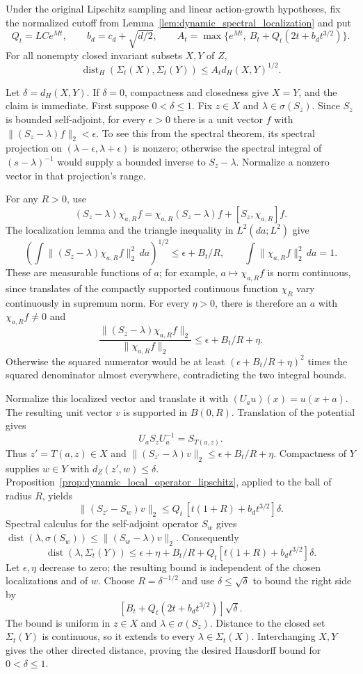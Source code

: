 \begin{corollary}
\label{cor:dynamic_subsystem_spectra}
Under the original Lipschitz sampling and linear action-growth
hypotheses, fix the normalized cutoff from
Lemma~\ref{lem:dynamic_spectral_localization} and put
\[
Q_t=LCe^{Mt},\qquad b_d=c_d+\sqrt{d/2},\qquad
A_t=\max\{e^{Mt},\ B_t+Q_t(2t+b_dt^{3/2})\}.
\]
For all nonempty closed invariant subsets $X,Y$ of $Z$,
\[
\operatorname{dist}_H(\Sigma_t(X),\Sigma_t(Y))
\leq A_t d_H(X,Y)^{1/2}.
\]
\end{corollary}
\Proof
Let $\delta=d_H(X,Y)$. If $\delta=0$, compactness and closedness give
$X=Y$, and the claim is immediate. First suppose $0<\delta\leq1$.
Fix $z\in X$ and $\lambda\in\sigma(S_z)$. Since $S_z$ is bounded
self-adjoint, for every $\epsilon>0$ there is a unit vector $f$ with
$\|(S_z-\lambda)f\|_2<\epsilon$. To see this from the spectral theorem,
its spectral projection on $(\lambda-\epsilon,\lambda+\epsilon)$ is
nonzero; otherwise the spectral integral of $(s-\lambda)^{-1}$ would
supply a bounded inverse to $S_z-\lambda$. Normalize a nonzero vector
in that projection's range.

For any $R>0$, use
\[
(S_z-\lambda)\chi_{a,R}f
=\chi_{a,R}(S_z-\lambda)f+[S_z,\chi_{a,R}]f.
\]
The localization lemma and the triangle inequality in $L^2(da;L^2)$
give
\[
\left(\int\|(S_z-\lambda)\chi_{a,R}f\|_2^2\,da\right)^{1/2}
\leq\epsilon+B_t/R,
\qquad \int\|\chi_{a,R}f\|_2^2\,da=1.
\]
These are measurable functions of $a$; for example,
$a\mapsto\chi_{a,R}f$ is norm continuous, since translates of the
compactly supported continuous function $\chi_R$ vary continuously in
supremum norm. For every $\eta>0$, there is therefore an $a$ with
$\chi_{a,R}f\ne0$ and
\[
\frac{\|(S_z-\lambda)\chi_{a,R}f\|_2}{\|\chi_{a,R}f\|_2}
\leq\epsilon+B_t/R+\eta.
\]
Otherwise the squared numerator would be at least
$(\epsilon+B_t/R+\eta)^2$ times the squared denominator almost
everywhere, contradicting the two integral bounds.

Normalize this localized vector and translate it with
$(U_au)(x)=u(x+a)$. The resulting unit vector $v$ is supported in
$B(0,R)$. Translation of the potential gives
\[
U_aS_zU_a^{-1}=S_{T(a,z)}.
\]
Thus $z'=T(a,z)\in X$ and
$\|(S_{z'}-\lambda)v\|_2\leq\epsilon+B_t/R+\eta$.
Compactness of $Y$ supplies $w\in Y$ with $d_Z(z',w)\leq\delta$.
Proposition~\ref{prop:dynamic_local_operator_lipschitz}, applied to the
ball of radius $R$, yields
\[
\|(S_{z'}-S_w)v\|_2
\leq Q_t\,[t(1+R)+b_dt^{3/2}]\delta.
\]
Spectral calculus for the self-adjoint operator $S_w$ gives
$\operatorname{dist}(\lambda,\sigma(S_w))
\leq\|(S_w-\lambda)v\|_2$. Consequently
\[
\operatorname{dist}(\lambda,\Sigma_t(Y))
\leq\epsilon+\eta+B_t/R
 +Q_t[t(1+R)+b_dt^{3/2}]\delta.
\]
Let $\epsilon,\eta$ decrease to zero; the resulting bound is independent
of the chosen localizations and of $w$. Choose $R=\delta^{-1/2}$ and
use $\delta\leq\sqrt\delta$ to bound the right side by
\[
[B_t+Q_t(2t+b_dt^{3/2})]\sqrt\delta.
\]
The bound is uniform in $z\in X$ and $\lambda\in\sigma(S_z)$.
Distance to the closed set $\Sigma_t(Y)$ is continuous, so it extends
to every $\lambda\in\Sigma_t(X)$. Interchanging $X,Y$ gives the other
directed distance, proving the desired Hausdorff bound for
$0<\delta\leq1$.

